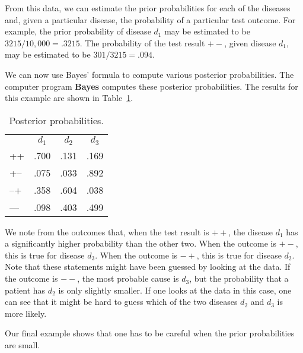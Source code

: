 \begin{example}
From this data, we can estimate the prior probabilities for each of the
diseases and, given a particular disease, the probability of a particular test
outcome.  For example, the prior probability of disease $d_1$ may be estimated
to be $3215/10{,}000 = .3215$.  The probability of the test result $+{}-$, given
disease $d_1$, may be estimated to be $301/3215 = .094$.
\par
We can now use Bayes' formula to compute various posterior probabilities.  The
computer program {\bf Bayes} computes these posterior probabilities.  The
results for this example are shown in Table~\ref{table 4.35}.


\begin{table}
\centering
\begin{tabular}{lccc}
                                    &  $d_1$ &  $d_2$ &  $d_3$  \\
+\hspace{.1in}+                     & .700   & .131   & .169    \\
+\hspace{.125in}--                    & .075   & .033   & .892    \\
\hspace{.025in}--\hspace{.125in}+     &
.358   & .604   & .038    \\
\hspace{.025in}--\hspace{.15in}--  &
.098   & .403   & .499    \\
\end{tabular}
\caption{Posterior probabilities.}
\label{table 4.35}
\end{table}
We note from the outcomes that, when the test result is $++$, the disease $d_1$
has a significantly higher probability than the other two.  When the outcome is $+-$,
this is true for disease $d_3$.  When the outcome is $-+$, this is true for disease $d_2$.
Note that these statements might have been guessed by looking at the data. If the outcome is $--$, 
the most probable cause is $d_3$, but the probability that a patient has $d_2$ is only slightly smaller.
If one looks at the data in this case, one can see that it might be hard to guess which of the two
diseases $d_2$ and $d_3$ is more likely.
\end{example}
 
Our final example shows that one has to be careful when the prior probabilities
are small.

